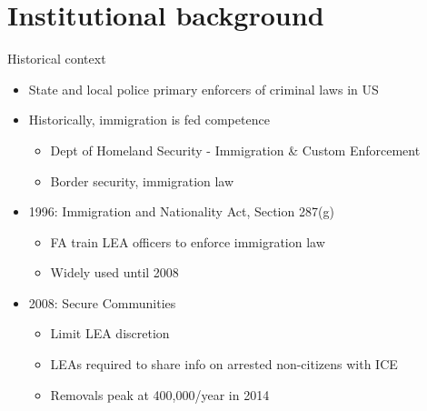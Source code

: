 \documentclass[xcolor=pdftex,dvipsnames,table]{beamer}
\begin{document}
\section{Institutional background}
\begin{frame}{Historical context}
\begin{itemize}
\item State and local police primary enforcers of criminal laws in US\vspace{0.20cm}
\item Historically, immigration is fed competence\vspace{0.10cm}
\begin{itemize}
\item Dept of Homeland Security - Immigration \& Custom Enforcement \vspace{0.10cm}
\item Border security, immigration law
\end{itemize}\vspace{0.20cm}
\item 1996: Immigration and Nationality Act, Section 287(g)\vspace{0.10cm}
\begin{itemize}
\item FA train LEA officers to enforce immigration law\vspace{0.10cm}
\item Widely used until 2008
\end{itemize}\vspace{0.20cm}
\item 2008: Secure Communities\vspace{0.10cm}
\begin{itemize}
\item Limit LEA discretion\vspace{0.10cm}
\item LEAs required to share info on arrested non-citizens with ICE \vspace{0.10cm}
\item Removals peak at 400,000/year in 2014
\end{itemize}
\end{itemize}
\end{frame}
\end{document}
